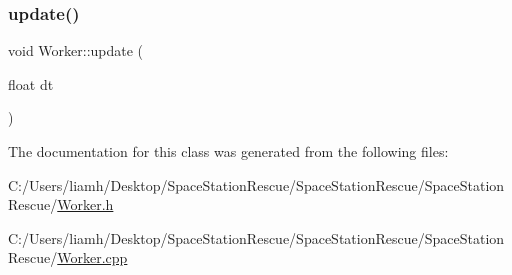 \subsubsection{\texorpdfstring{update()}{update()}}
{\footnotesize\ttfamily void Worker\+::update (\begin{DoxyParamCaption}\item[{float}]{dt }\end{DoxyParamCaption})}



The documentation for this class was generated from the following files\+:\begin{DoxyCompactItemize}
\item 
C\+:/\+Users/liamh/\+Desktop/\+Space\+Station\+Rescue/\+Space\+Station\+Rescue/\+Space\+Station\+Rescue/\mbox{\hyperlink{_worker_8h}{Worker.\+h}}\item 
C\+:/\+Users/liamh/\+Desktop/\+Space\+Station\+Rescue/\+Space\+Station\+Rescue/\+Space\+Station\+Rescue/\mbox{\hyperlink{_worker_8cpp}{Worker.\+cpp}}\end{DoxyCompactItemize}
